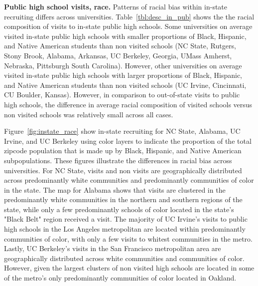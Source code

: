 \documentclass[twoside]{article}
\begin{document}

\textbf{Public high school visits, race.} Patterns of racial bias within in-state recruiting differs across universities. Table~\ref{tbl:desc_in_pub} shows the the racial composition of visits to in-state public high schools. Some universities on average visited in-state public high schools with smaller proportions of Black, Hispanic, and Native American students than non visited schools (NC State, Rutgers, Stony Brook, Alabama, Arkansas, UC Berkeley, Georgia, UMass Amherst, Nebraska, Pittsburgh South Carolina). However, other universities on average visited in-state public high schools with larger proportions of Black,  Hispanic, and Native American students than non visited schools (UC Irvine, Cincinnati, CU Boulder, Kansas). However, in comparison to out-of-state visits to public high schools, the difference in average racial composition of visited schools versus non visited schools was relatively small across all cases.

Figure~\ref{fig:instate_race} show in-state recruiting for NC State, Alabama, UC Irvine, and UC Berkeley using color layers to indicate the proportion of the total zipcode population that is made up by Black, Hispanic, and Native American subpopulations. These figures illustrate the differences in racial bias across universities. For NC State, visits and non visits are geographically distributed across predominantly white communities and predominantly communities of color in the state. The map for Alabama shows that visits are clustered in the predominantly white communities in the northern and southern regions of the state, while only a few predominantly schools of color located in the state's "Black Belt" region received a visit. The majority of UC Irvine's visits to public high schools in the Los Angeles metropolitan are located within predominantly communities of color, with only a few visits to whitest communities in the metro. Lastly, UC Berkeley's visits in the San Francisco metropolitan area are geographically distributed across white communities and communities of color. However, given  the largest clusters of non visited high schools are located in some of the metro's only predominantly communities of color located in Oakland.
\end{document}

